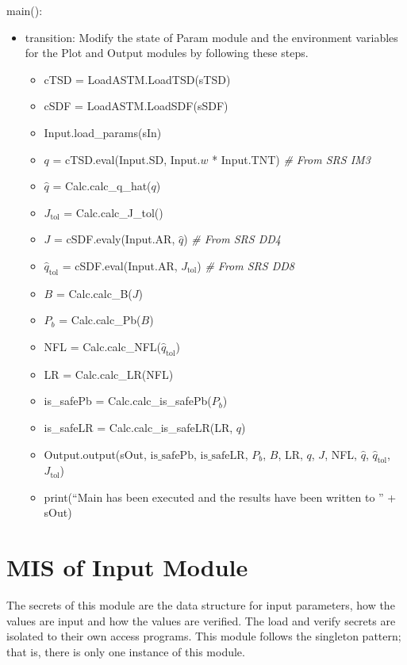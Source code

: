 \documentclass[12pt, titlepage]{article}
\begin{document}
\noindent main():
\begin{itemize}
\item transition: Modify the state of Param module and the environment variables
  for the Plot and Output modules by following these steps.
\begin{itemize}
\item cTSD = LoadASTM.LoadTSD(sTSD)
\item cSDF = LoadASTM.LoadSDF(sSDF)
\item Input.load\_params(sIn)
\item $q$ = cTSD.eval(Input.SD, Input.$w$ * Input.TNT) \textit{\# From SRS IM3}
\item $\hat{q}$ = Calc.calc\_q\_hat($q$)
\item $J_\text{tol}$ = Calc.calc\_J\_tol()
\item $J$ = cSDF.evaly(Input.AR, $\hat{q}$) \textit{\# From SRS DD4}
\item $\hat{q}_\text{tol}$ = cSDF.eval(Input.AR, $J_\text{tol}$) \textit{\# From SRS DD8}
\item $B$ = Calc.calc\_B($J$)
\item $P_b$ = Calc.calc\_Pb($B$)
\item NFL = Calc.calc\_NFL($\hat{q}_\text{tol}$)
\item LR = Calc.calc\_LR(NFL)
\item is\_safePb = Calc.calc\_is\_safePb($P_b$)
\item is\_safeLR = Calc.calc\_is\_safeLR(LR, $q$)
\item Output.output(sOut, $\mbox{is\_safePb}$, $\mbox{is\_safeLR}$, $P_b$, $B$, LR, $q$, $J$, NFL, $\hat{q}$,
         $\hat{q}_{\text{tol}}$, $J_{\text{tol}}$)
\item print(``Main has been executed and the results have been written to '' + sOut)
\end{itemize}
\end{itemize}

\newpage


\section{MIS of Input Module} \label{Input}

The secrets of this module are the data structure for input parameters, how the
values are input and how the values are verified.  The load and verify secrets
are isolated to their own access programs.  This module follows the singleton
pattern; that is, there is only one instance of this module.
\end{document}

